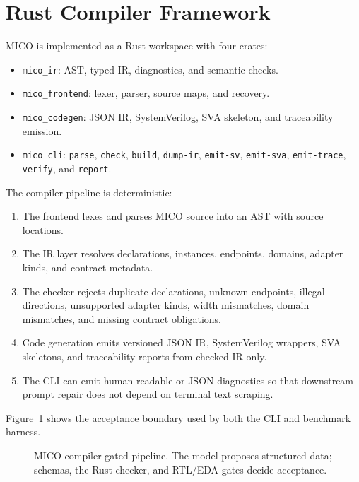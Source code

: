 \section{Rust Compiler Framework}

MICO is implemented as a Rust workspace with four crates:

\begin{itemize}
  \item \texttt{mico\_ir}: AST, typed IR, diagnostics, and semantic checks.
  \item \texttt{mico\_frontend}: lexer, parser, source maps, and recovery.
  \item \texttt{mico\_codegen}: JSON IR, SystemVerilog, SVA skeleton, and traceability emission.
  \item \texttt{mico\_cli}: \texttt{parse}, \texttt{check}, \texttt{build}, \texttt{dump-ir}, \texttt{emit-sv}, \texttt{emit-sva}, \texttt{emit-trace}, \texttt{verify}, and \texttt{report}.
\end{itemize}

The compiler pipeline is deterministic:

\begin{enumerate}
  \item The frontend lexes and parses MICO source into an AST with source locations.
  \item The IR layer resolves declarations, instances, endpoints, domains, adapter kinds, and contract metadata.
  \item The checker rejects duplicate declarations, unknown endpoints, illegal directions, unsupported adapter kinds, width mismatches, domain mismatches, and missing contract obligations.
  \item Code generation emits versioned JSON IR, SystemVerilog wrappers, SVA skeletons, and traceability reports from checked IR only.
  \item The CLI can emit human-readable or JSON diagnostics so that downstream prompt repair does not depend on terminal text scraping.
\end{enumerate}

Figure~\ref{fig:mico-pipeline} shows the acceptance boundary used by both the
CLI and benchmark harness.

\begin{figure}[t]
  \centering
  \caption{MICO compiler-gated pipeline. The model proposes structured data; schemas, the Rust checker, and RTL/EDA gates decide acceptance.}
  \label{fig:mico-pipeline}
\end{figure}

